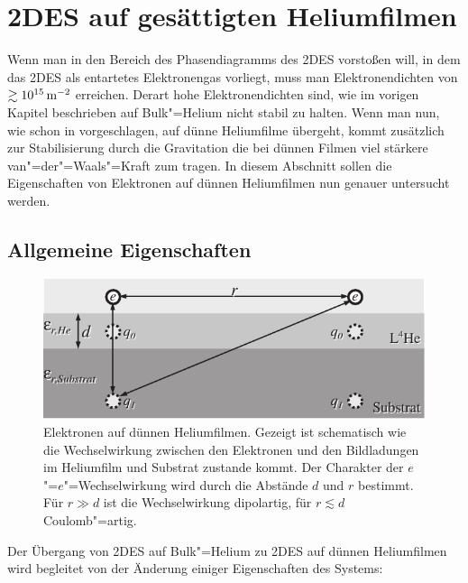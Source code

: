 \section{2DES auf gesättigten Heliumfilmen}
Wenn man in den Bereich des Phasendiagramms des 2DES vorstoßen will, in dem das 2DES als entartetes Elektronengas vorliegt, muss man Elektronendichten von $\gtrsim\unit[10^{15}]{\Em}$ erreichen. Derart hohe Elektronendichten sind, wie im vorigen Kapitel beschrieben auf Bulk"=Helium nicht stabil zu halten. Wenn man nun, wie schon in \cite{Ike81} vorgeschlagen, auf dünne Heliumfilme übergeht, kommt zusätzlich zur Stabilisierung durch die Gravitation die bei dünnen Filmen viel stärkere van"=der"=Waals"=Kraft zum tragen. In diesem Abschnitt sollen die Eigenschaften von Elektronen auf dünnen Heliumfilmen nun genauer untersucht werden.
 
\subsection{Allgemeine Eigenschaften}
\label{ssec:hefilm_allgemein}

\begin{figure}[h!tbp]
    \begin{center}
        \includegraphics{theo_helium_filme/e_auf_filmen}
    \end{center}
    \caption[Wechselwirkungen auf dünnen Heliumfilmen]{Elektronen auf dünnen Heliumfilmen. Gezeigt ist schematisch wie die Wechselwirkung zwischen den Elektronen und den Bildladungen im Heliumfilm und Substrat zustande kommt. Der Charakter der $e$"=$e$"=Wechselwirkung wird durch die Abstände $d$ und $r$ bestimmt. Für $r\gg d$ ist die Wechselwirkung dipolartig, für $r\lesssim d$ Coulomb"=artig.}
    \label{eqn:film_schema}
\end{figure}

Der Übergang von 2DES auf Bulk"=Helium zu 2DES auf dünnen Heliumfilmen wird begleitet von der Änderung einiger Eigenschaften des Systems:

